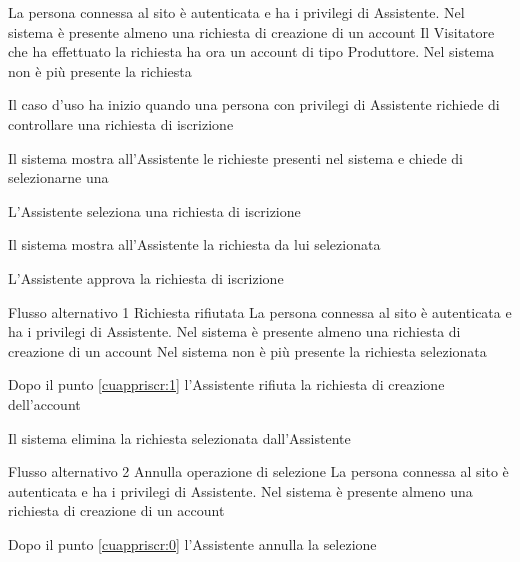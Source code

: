 {}
{La persona connessa al sito è autenticata e ha i privilegi di  Assistente. Nel sistema è presente almeno una richiesta di creazione di un account}
{Il Visitatore che ha effettuato la richiesta ha ora un account di tipo Produttore. Nel sistema non è più presente la richiesta}
{\begin{enumCU}
	\item Il caso d'uso ha inizio quando una persona con privilegi di Assistente richiede di controllare una richiesta di iscrizione
	\item Il sistema mostra all'Assistente le richieste presenti nel sistema e chiede di selezionarne una\label{cuappriscr:0}
	\item L'Assistente seleziona una richiesta di iscrizione
	\item Il sistema mostra all'Assistente la richiesta da lui selezionata\label{cuappriscr:1}
	\item L'Assistente approva la richiesta di iscrizione
\end{enumCU}}
%
{Flusso alternativo 1}%
{Richiesta rifiutata}%
{La persona connessa al sito è autenticata e ha i privilegi di  Assistente. Nel sistema è presente almeno una richiesta di creazione di un account}%
{Nel sistema non è più presente la richiesta selezionata}%
{\begin{enumCU}
		\item Dopo il punto \ref{cuappriscr:1} l'Assistente rifiuta la richiesta di creazione dell'account
		\item Il sistema elimina la richiesta selezionata dall'Assistente
\end{enumCU}}%
%
{Flusso alternativo 2}%
{Annulla operazione di selezione}%
{La persona connessa al sito è autenticata e ha i privilegi di  Assistente. Nel sistema è presente almeno una richiesta di creazione di un account}%
{\postNulle}%
{\begin{enumCU}
		\item Dopo il punto \ref{cuappriscr:0} l'Assistente annulla la selezione
\end{enumCU}}%

